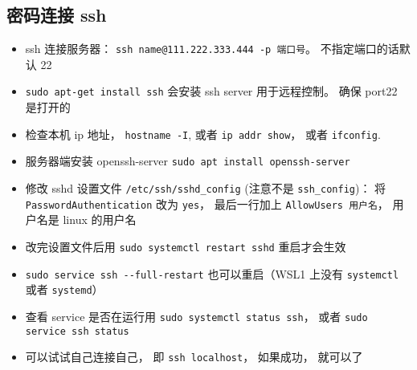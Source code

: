 
\subsection{密码连接 ssh}
\begin{itemize}
\item ssh 连接服务器： \verb|ssh name@111.222.333.444 -p 端口号|。 不指定端口的话默认 22
\item \verb`sudo apt-get install ssh` 会安装 ssh server 用于远程控制。 确保 port22 是打开的
\item 检查本机 ip 地址， \verb`hostname -I`, 或者 \verb`ip addr show`， 或者 \verb|ifconfig|.
\item 服务器端安装 openssh-server \verb`sudo apt install openssh-server`
\item 修改 sshd 设置文件 \verb`/etc/ssh/sshd_config` (注意不是 \verb`ssh_config`)： 将 \verb`PasswordAuthentication` 改为 \verb`yes`， 最后一行加上 \verb`AllowUsers 用户名`， 用户名是 linux 的用户名
\item 改完设置文件后用 \verb`sudo systemctl restart sshd` 重启才会生效
\item \verb|sudo service ssh --full-restart| 也可以重启（WSL1 上没有 \verb|systemctl| 或者 \verb|systemd|）
\item 查看 service 是否在运行用  \verb`sudo systemctl status ssh`， 或者 \verb|sudo service ssh status|
\item 可以试试自己连接自己， 即 \verb`ssh localhost`， 如果成功， 就可以了
\end{itemize}

